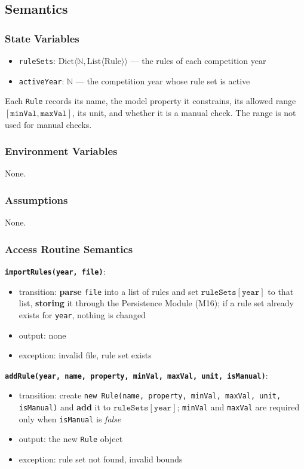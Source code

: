 \documentclass[12pt, titlepage]{article}
\begin{document}
\subsection{Semantics}

\subsubsection{State Variables}
\begin{itemize}
  \item \texttt{ruleSets}: $\text{Dict}\langle \mathbb{N}, \text{List}\langle \text{Rule} \rangle \rangle$ --- the rules of each competition year
  \item \texttt{activeYear}: $\mathbb{N}$ --- the competition year whose rule set is active
\end{itemize}

Each \texttt{Rule} records its name, the model property it constrains, its allowed range $[\texttt{minVal}, \texttt{maxVal}]$, its unit, and whether it is a manual check. The range is not used for manual checks.

\subsubsection{Environment Variables}
None.

\subsubsection{Assumptions}
None.

\subsubsection{Access Routine Semantics}

\textbf{\texttt{importRules(year, file)}}:
\begin{itemize}
  \item transition: \textbf{parse} \texttt{file} into a list of rules and set $\texttt{ruleSets}[\texttt{year}]$ to that list, \textbf{storing} it through the Persistence Module (M16); if a rule set already exists for \texttt{year}, nothing is changed
  \item output: none
  \item exception: invalid file, rule set exists
\end{itemize}

\textbf{\texttt{addRule(year, name, property, minVal, maxVal, unit, isManual)}}:
\begin{itemize}
  \item transition: create \texttt{new Rule(name, property, minVal, maxVal, unit, isManual)} and \textbf{add} it to $\texttt{ruleSets}[\texttt{year}]$; \texttt{minVal} and \texttt{maxVal} are required only when \texttt{isManual} is \textit{false}
  \item output: the new \texttt{Rule} object
  \item exception: rule set not found, invalid bounds
\end{itemize}
\end{document}
